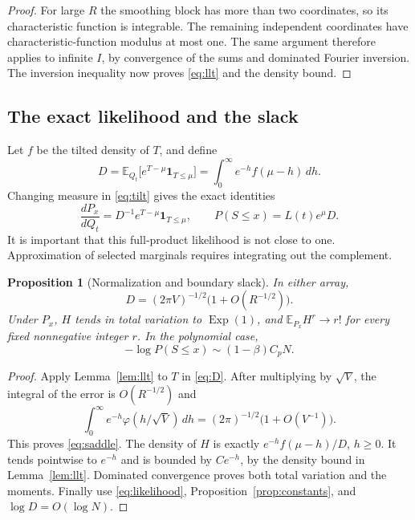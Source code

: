 \documentclass[11pt,a4paper]{article}
\numberwithin{equation}{section}
\newtheorem{proposition}[theorem]{Proposition}
\theoremstyle{definition}
\theoremstyle{remark}
\newcommand{\E}{\mathbb E}
\newcommand{\ind}{\mathbf 1}
\newcommand{\Exp}{\operatorname{Exp}}
\newcommand{\ph}{\varphi}
\begin{document}
\begin{proof}
For large $R$ the smoothing block has more than two coordinates, so
its characteristic function is integrable. The remaining independent
coordinates have characteristic-function modulus at most one. The
same argument therefore applies to infinite $I$, by convergence of the
sums and dominated Fourier inversion. The inversion inequality now
proves \eqref{eq:llt} and the density bound.
\end{proof}

\subsection{The exact likelihood and the slack}
Let $f$ be the tilted density of $T$, and define
\begin{equation}
 D=\E_{Q_t}\big[e^{T-\mu}\ind_{T\le\mu}\big]
   =\int_0^\infty e^{-h}f(\mu-h)\,dh.
 \label{eq:D}
\end{equation}
Changing measure in \eqref{eq:tilt} gives the exact identities
\begin{equation}
 \frac{dP_x}{dQ_t}=D^{-1}e^{T-\mu}\ind_{T\le\mu},
 \qquad P(S\le x)=L(t)e^\mu D. \label{eq:likelihood}
\end{equation}
It is important that this full-product likelihood is not close to one.
Approximation of selected marginals requires integrating out the
complement.

\begin{proposition}[Normalization and boundary slack]
\label{prop:slack}
In either array,
\begin{equation}
 D=(2\pi V)^{-1/2}\big(1+O(R^{-1/2})\big). \label{eq:saddle}
\end{equation}
Under $P_x$, $H$ tends in total variation to $\Exp(1)$, and
$\E_{P_x}H^r\to r!$ for every fixed nonnegative integer $r$.
In the polynomial case,
\begin{equation}
 -\log P(S\le x)\sim (1-\beta)C_pN. \label{eq:smallball}
\end{equation}
\end{proposition}
\begin{proof}
Apply Lemma~\ref{lem:llt} to $T$ in \eqref{eq:D}. After multiplying
by $\sqrt V$, the integral of the error is $O(R^{-1/2})$ and
\[
 \int_0^\infty e^{-h}\ph(h/\sqrt V)\,dh
 =(2\pi)^{-1/2}\big(1+O(V^{-1})\big).
\]
This proves \eqref{eq:saddle}. The density of $H$ is exactly
$e^{-h}f(\mu-h)/D$, $h\ge0$. It tends pointwise to $e^{-h}$ and
is bounded by $Ce^{-h}$, by the density bound in
Lemma~\ref{lem:llt}. Dominated convergence proves both total variation
and the moments. Finally use \eqref{eq:likelihood},
Proposition~\ref{prop:constants}, and $\log D=O(\log N)$.
\end{proof}
\end{document}
